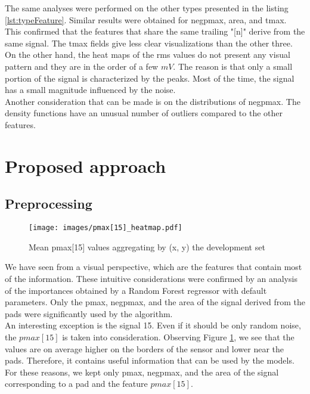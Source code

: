 \documentclass[conference]{IEEEtran}
\begin{document}
The same analyses were performed on the other types presented in the listing \ref{lst:typeFeature}. Similar results were obtained for negpmax, area, and tmax. This confirmed that the features that share the same trailing "[n]" derive from the same signal. The tmax fields give less clear visualizations than the other three. On the other hand, the heat maps of the rms values do not present any visual pattern and they are in the order of a few $mV$. The reason is that only a small portion of the signal is characterized by the peaks. Most of the time, the signal has a small magnitude influenced by the noise.\\

Another consideration that can be made is on the distributions of negpmax. The density functions have an unusual number of outliers compared to the other features. 

\section{Proposed approach}
\subsection{Preprocessing}

\begin{figure}[htbp]
\centerline{\texttt{[image: images/pmax[15]\_heatmap.pdf]}}
\caption{Mean pmax[15] values aggregating by (x, y) the development set}
\label{fig:pmax[15]_heatmap}
\end{figure}
We have seen from a visual perspective, which are the features that contain most of the information. These intuitive considerations were confirmed by an analysis of the importances obtained by a Random Forest regressor with default parameters. Only the pmax, negpmax, and the area of the signal derived from the pads were significantly used by the algorithm.\\ 
An interesting exception is the signal 15. Even if it should be only random noise, the $pmax[15]$ is taken into consideration. Observing Figure \ref{fig:pmax[15]_heatmap}, we see that the values are on average higher on the borders of the sensor and lower near the pads. Therefore, it contains useful information that can be used by the models. \\
For these reasons, we kept only pmax, negpmax, and the area of the signal corresponding to a pad and the feature $pmax[15]$.\\
\end{document}
